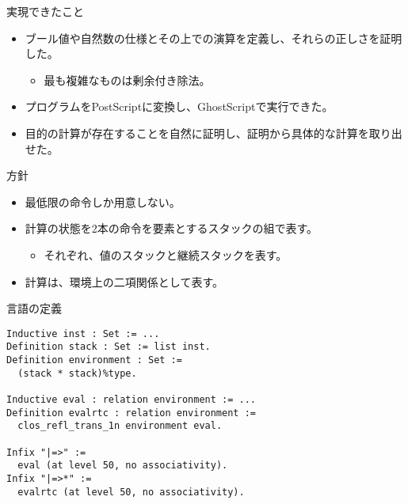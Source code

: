\documentclass[cjk, 14pt, dvipdfm]{beamer}
\begin{document}
\begin{frame}{実現できたこと}

  \begin{itemize}
    \item ブール値や自然数の仕様とその上での演算を定義し、それらの正しさを証明した。
    \begin{itemize}
      \item 最も複雑なものは剰余付き除法。
    \end{itemize}
    \item プログラムをPostScriptに変換し、GhostScriptで実行できた。
    \item 目的の計算が存在することを自然に証明し、証明から具体的な計算を取り出せた。
  \end{itemize}

\end{frame}

\begin{frame}{方針}

  \begin{itemize}
    \item 最低限の命令しか用意しない。
    \item 計算の状態を2本の命令を要素とするスタックの組で表す。
    \begin{itemize}
      \item それぞれ、値のスタックと継続スタックを表す。
    \end{itemize}
    \item 計算は、環境上の二項関係として表す。
  \end{itemize}

\end{frame}

\begin{frame}[fragile]{言語の定義}

\small
\begin{verbatim}
Inductive inst : Set := ...
Definition stack : Set := list inst.
Definition environment : Set :=
  (stack * stack)%type.

Inductive eval : relation environment := ...
Definition evalrtc : relation environment :=
  clos_refl_trans_1n environment eval.

Infix "|=>" :=
  eval (at level 50, no associativity).
Infix "|=>*" :=
  evalrtc (at level 50, no associativity).
\end{verbatim}

\end{frame}
\end{document}
